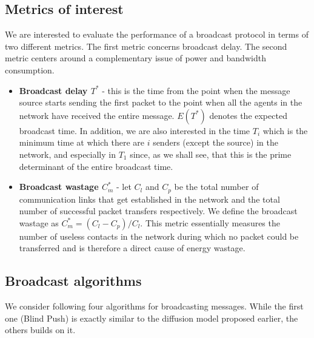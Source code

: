 \subsection{Metrics of interest}
We are interested to evaluate the performance of a broadcast protocol in terms of two different metrics. The first metric concerns broadcast delay. 
The second metric centers around a complementary issue of power and bandwidth consumption.
\begin{itemize}
 \item \textbf{Broadcast delay $T^*$} - this is the time from the point when the message source starts sending the first packet to the point when all the agents in the network have received the entire message. 
 $E(T^*)$ denotes the expected broadcast time. 
 In addition, we are also interested in the time $T_i$ which is the minimum time at which there are $i$ senders (except the source) in the network, and especially in $T_1$ since, as we shall see, that this is the prime determinant of the entire broadcast time. 
 \item \textbf{Broadcast wastage $C_m^*$} - let $C_l$ and $C_p$ be the total number of communication links that get established in the network and the total number of successful packet transfers respectively. We define the broadcast wastage as $C_m^* = (C_l - C_p)/C_l$. This metric essentially measures the number of useless contacts in the network during which no packet could be transferred and is therefore a direct cause of energy wastage.
\end{itemize}

\subsection{Broadcast algorithms}
We consider following four algorithms for broadcasting messages. While the first one (Blind Push) is exactly similar to the diffusion model proposed earlier, the others 
builds on it.
